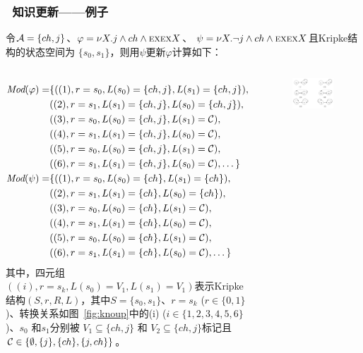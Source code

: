 \documentclass[9pt, CJK]{beamer}
\begin{document}
\begin{frame}
	\frametitle{~知识更新——{\footnotesize 例子}}
	{\tiny
		\begin{example}
			令${\cal A}=\{ch, j\}$、$\varphi = \nu X. j \wedge ch \wedge \textsc{e} \textsc{x} \textsc{e} \textsc{x} X$、 $\psi= \nu X. \neg j \wedge ch \wedge \textsc{e} \textsc{x} \textsc{e} \textsc{x} X$且Kripke结构的状态空间为 $\{s_0,s_1\}$，则用$\psi$更新$\varphi$计算如下：
			\begin{columns}
				\begin{align*}
					\textit{Mod}(\varphi) = & \{((1), r=s_0, L(s_0)=\{ch,j\}, L(s_1)=\{ch,j\}), \\
					& ((2),  r=s_1, L(s_1)=\{ch,j\}, L(s_0)=\{ch,j\}),\\
					& ((3),  r=s_0, L(s_0)=\{ch,j\}, L(s_1)={\cal C}), \\
					& ((4),  r=s_1, L(s_1)=\{ch,j\}, L(s_0)={\cal C}), \\
					& ((5),  r=s_0, L(s_0)=\{ch,j\}, L(s_1)={\cal C}), \\
					& ((6),  r=s_1, L(s_1)=\{ch,j\}, L(s_0)={\cal C}), \dots\}\\
					\textit{Mod}(\psi) = & \{((1), r=s_0, L(s_0)=\{ch\}, L(s_1)=\{ch\}),\\
					& ((2), r=s_1, L(s_1)=\{ch\}, L(s_0)=\{ch\}),\\
					& ((3), r=s_0, L(s_0)=\{ch\}, L(s_1)={\cal C}),\\
					& ((4), r=s_1, L(s_1)=\{ch\}, L(s_0)={\cal C}), \\
					& ((5), r=s_0, L(s_0)=\{ch\}, L(s_1)={\cal C}),\\
					& ((6), r=s_1, L(s_1)=\{ch\}, L(s_0)={\cal C}), \dots\}
				\end{align*}
				其中，四元组$((i), r= s_k, L(s_0)=V_1, L(s_1)=V_1)$表示Kripke结构$(S,r,R,L)$，其中$S=\{s_0, s_1\}$、$r=s_k$ ($r\in \{0,1\}$)、转换关系如图~\ref{fig:knoup}中的(i) ($i \in \{1,2,3,4,5,6\}$)、$s_0$ 和$s_1$分别被 $V_1 \subseteq \{ch,j\}$ 和 $V_2\subseteq \{ch,j\}$标记且${\cal C} \in \{\emptyset, \{j\}, \{ch\}, \{j,ch\}\}$。
					\begin{figure}
					\includegraphics[scale=0.4]{figures/knowledge_update}

\end{figure}
\end{columns}
\end{example}}
\end{frame}
\end{document}
